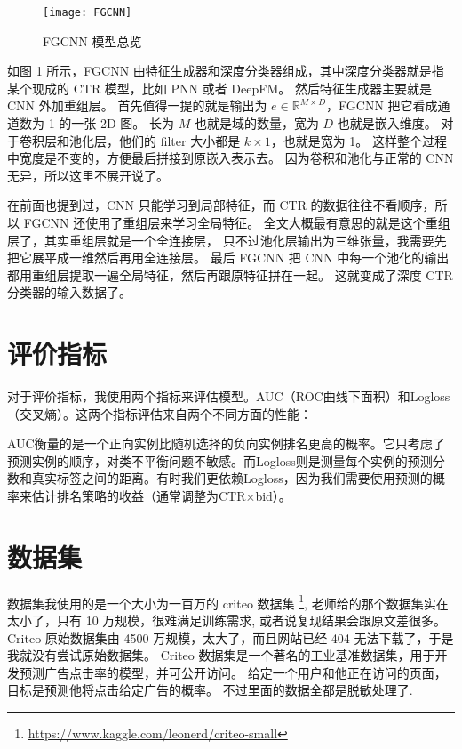 \documentclass[degree=master,cjk-font=noto]{thuthesis}
\begin{document}
\begin{figure}[h]
\centering%
\texttt{[image: FGCNN]}
  \caption{FGCNN 模型总览}
  \label{fig:fgcnn}
\end{figure}

如图 \ref{fig:fgcnn} 所示，FGCNN 由特征生成器和深度分类器组成，其中深度分类器就是指某个现成的 CTR 模型，比如 PNN 或者 DeepFM。
然后特征生成器主要就是 CNN 外加重组层。
首先值得一提的就是输出为 $e \in \mathbb{R}^{M \times D}$，FGCNN 把它看成通道数为 1 的一张 2D 图。
长为 $M$ 也就是域的数量，宽为 $D$ 也就是嵌入维度。
对于卷积层和池化层，他们的 filter 大小都是 $k \times 1$，也就是宽为 1。
这样整个过程中宽度是不变的，方便最后拼接到原嵌入表示去。
因为卷积和池化与正常的 CNN 无异，所以这里不展开说了。

在前面也提到过，CNN 只能学习到局部特征，而 CTR 的数据往往不看顺序，所以 FGCNN 还使用了重组层来学习全局特征。
全文大概最有意思的就是这个重组层了，其实重组层就是一个全连接层，
只不过池化层输出为三维张量，我需要先把它展平成一维然后再用全连接层。
最后 FGCNN 把 CNN 中每一个池化的输出都用重组层提取一遍全局特征，然后再跟原特征拼在一起。
这就变成了深度 CTR 分类器的输入数据了。

\chapter{评价指标}
\label{chap:metrics}

对于评价指标，我使用两个指标来评估模型。AUC（ROC曲线下面积）和Logloss（交叉熵）。这两个指标评估来自两个不同方面的性能：

AUC衡量的是一个正向实例比随机选择的负向实例排名更高的概率。它只考虑了预测实例的顺序，对类不平衡问题不敏感。而Logloss则是测量每个实例的预测分数和真实标签之间的距离。有时我们更依赖Logloss，因为我们需要使用预测的概率来估计排名策略的收益（通常调整为CTR×bid）。

\chapter{数据集}

数据集我使用的是一个大小为一百万的 criteo 数据集 \footnote{\url{https://www.kaggle.com/leonerd/criteo-small}}, 老师给的那个数据集实在太小了，只有 10 万规模，很难满足训练需求, 或者说复现结果会跟原文差很多。
Criteo 原始数据集由 4500 万规模，太大了，而且网站已经 404 无法下载了，于是我就没有尝试原始数据集。
Criteo 数据集是一个著名的工业基准数据集，用于开发预测广告点击率的模型，并可公开访问。 给定一个用户和他正在访问的页面，目标是预测他将点击给定广告的概率。
不过里面的数据全都是脱敏处理了.
\end{document}
